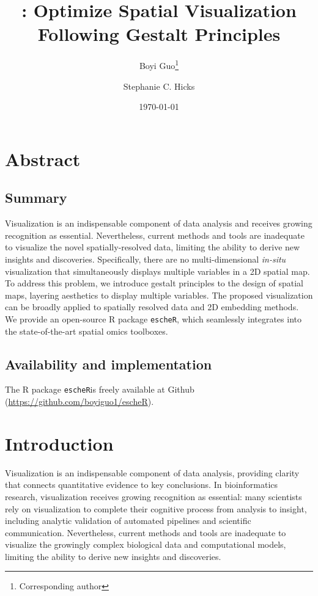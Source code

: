 \documentclass[11pt]{article}
\title{\coloc: Optimize Spatial Visualization Following Gestalt Principles}
\author[1]{Boyi Guo\thanks{Corresponding author}}
\author[1]{Stephanie C. Hicks}
\affil[1]{Department of Biostatistics, Johns Hopkins Bloomberg School of Public Health, MD, USA}
\date{\today}
\newcommand{\fixme}[1]{{\color{red} (#1)}}
\newcommand{\coloc}{\texttt{escheR}}
\begin{document}
\maketitle

\vspace{-.6in}

\section*{Abstract}
\subsection*{Summary}
Visualization is an indispensable component of data analysis and receives growing recognition as essential. Nevertheless, current methods and
tools are inadequate to visualize the novel spatially-resolved data, limiting the ability to derive new insights and discoveries. Specifically, there are no multi-dimensional \textit{in-situ} visualization that simultaneously displays multiple variables in a 2D spatial map. To address this problem, we introduce gestalt principles to the design of spatial maps, layering aesthetics to display multiple variables. The proposed visualization can be broadly applied to spatially resolved data and 2D embedding methods. We provide an open-source R package \coloc, which seamlessly integrates into the state-of-the-art spatial omics toolboxes.

\subsection*{Availability and implementation}
The R package \coloc is freely available at Github (\url{https://github.com/boyiguo1/escheR}).


\section*{Introduction}
Visualization is an indispensable component of data analysis, providing clarity that connects quantitative evidence to key conclusions.\cite{dagostinomcgowan_2022} In bioinformatics research, visualization receives growing recognition as essential: many scientists rely on visualization to complete their cognitive process from analysis to insight, including analytic validation of automated pipelines and scientific communication.\cite{odonoghue_2021} Nevertheless, current methods and tools are inadequate to visualize the growingly complex biological data and computational models, limiting the ability to derive new insights and discoveries.\cite{odonoghue_2010}  
\end{document}
